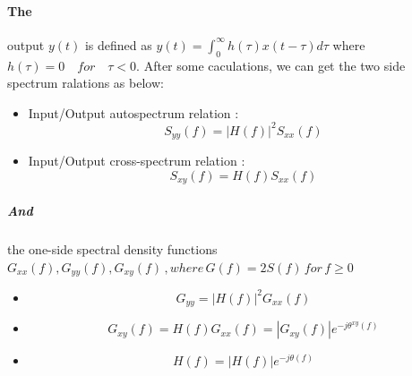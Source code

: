 \documentclass[12pt,a4paper]{article}
\begin{document}
			\paragraph{The}output $y(t)$ is defined as $y(t)=\int_{0}^{\infty}h(\tau)x(t-\tau)d\tau$ where $h(\tau)=0 \quad for \quad\tau<0.$ After some caculations, we can get the two side spectrum ralations as below:\\
			\begin{itemize}
				\item Input/Output autospectrum relation : 
					\begin{equation}
						S_{yy}(f)=|H(f)|^{2}S_{xx}(f)
					\end{equation}
				\item Input/Output cross-spectrum relation : 
					\begin{equation}
						S_{xy}(f)=H(f)S_{xx}(f)
					\end{equation}
			\end{itemize}
			\subparagraph{And}the one-side spectral density functions $G_{xx}(f),G_{yy}(f),G_{xy}(f)\,,where\, G(f)=2S(f)\,for\,f\geq0$\\
			\begin{itemize}
				\item
					\begin{equation}
						G_{yy}=|H(f)|^{2}G_{xx}(f)
					\end{equation}
				\item 
					\begin{equation}
						G_{xy}(f)=H(f)G_{xx}(f)=|G_{xy}(f)|e^{-j\theta^{xy}(f)}
					\end{equation}
				\item 
					\begin{equation}
						H(f)=|H(f)|e^{-j\theta(f)}
					\end{equation}
			\end{itemize}
\end{document}
